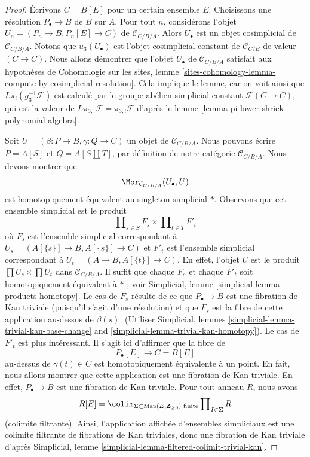 \begin{proof}
Écrivons $C = B[E]$ pour un certain ensemble $E$. Choisissons une résolution
$P_\bullet \to B$ de $B$ sur $A$. Pour tout $n$, considérons l'objet
$U_n = (P_n \to B, P_n[E] \to C)$ de $\mathcal{C}_{C/B/A}$. Alors
$U_\bullet$ est un objet cosimplicial de $\mathcal{C}_{C/B/A}$. Notons que
$u_3(U_\bullet)$ est l'objet cosimplicial constant de
$\mathcal{C}_{C/B}$ de valeur $(C \to C)$. Nous allons démontrer que l'objet
$U_\bullet$ de $\mathcal{C}_{C/B/A}$ satisfait aux hypothèses de
Cohomologie sur les sites, lemme
\ref{sites-cohomology-lemma-compute-by-cosimplicial-resolution}.
Cela implique le lemme, car on voit ainsi que $L\pi_!(g_3^{-1}\mathcal{F})$
est calculé par le groupe abélien simplicial constant
$\mathcal{F}(C \to C)$, qui est la valeur de
$L\pi_{3, !}\mathcal{F} = \pi_{3, !}\mathcal{F}$ d'après le lemme
\ref{lemma-pi-lower-shriek-polynomial-algebra}.

\medskip\noindent
Soit $U = (\beta : P \to B, \gamma : Q \to C)$ un objet de
$\mathcal{C}_{C/B/A}$. Nous pouvons écrire $P = A[S]$ et
$Q = A[S \amalg T]$, par définition de notre catégorie
$\mathcal{C}_{C/B/A}$. Nous devons montrer que
$$
\Mor_{\mathcal{C}_{C/B/A}}(U_\bullet, U)
$$
est homotopiquement équivalent au singleton simplicial $*$. Observons que
cet ensemble simplicial est le produit
$$
\prod\nolimits_{s \in S} F_s \times \prod\nolimits_{t \in T} F'_t
$$
où $F_s$ est l'ensemble simplicial correspondant à
$U_s = (A[\{s\}] \to B, A[\{s\}] \to C)$
et $F'_t$ est l'ensemble simplicial correspondant à
$U_t = (A \to B, A[\{t\}] \to C)$. En effet, l'objet $U$ est le produit
$\prod U_s \times \prod U_t$ dans $\mathcal{C}_{C/B/A}$. Il suffit que
chaque $F_s$ et chaque $F'_t$ soit homotopiquement équivalent à $*$ ; voir
Simplicial, lemme \ref{simplicial-lemma-products-homotopy}. Le cas de $F_s$
résulte de ce que $P_\bullet \to B$ est une fibration de Kan triviale
(puisqu'il s'agit d'une résolution) et que $F_s$ est la fibre de cette
application au-dessus de $\beta(s)$. (Utiliser Simplicial, lemmes
\ref{simplicial-lemma-trivial-kan-base-change} and
\ref{simplicial-lemma-trivial-kan-homotopy}).
Le cas de $F'_t$ est plus intéressant. Il s'agit ici d'affirmer que la
fibre de
$$
P_\bullet[E] \longrightarrow C = B[E]
$$
au-dessus de $\gamma(t) \in C$ est homotopiquement équivalente à un point.
En fait, nous allons montrer que cette application est une fibration de Kan
triviale. En effet, $P_\bullet \to B$ est une fibration de Kan triviale.
Pour tout anneau $R$, nous avons
$$
R[E] =
\colim_{\Sigma \subset \text{Map}(E, \mathbf{Z}_{\geq 0})\text{ finite}}
\prod\nolimits_{I \in \Sigma} R
$$
(colimite filtrante). Ainsi, l'application affichée d'ensembles simpliciaux
est une colimite filtrante de fibrations de Kan triviales, donc une fibration
de Kan triviale d'après Simplicial, lemme
\ref{simplicial-lemma-filtered-colimit-trivial-kan}.
\end{proof}

